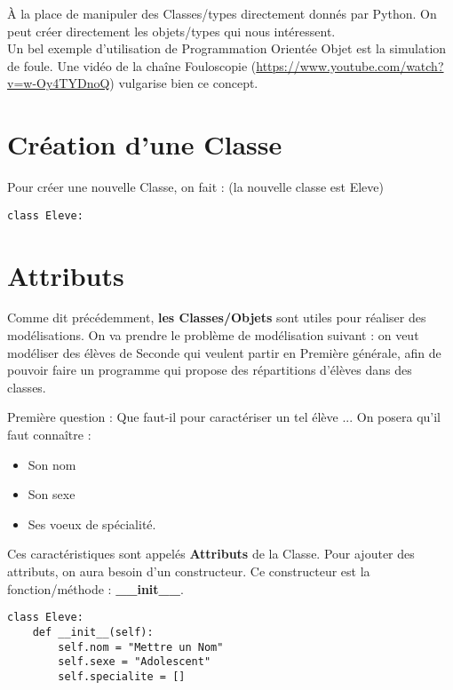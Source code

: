 \documentclass[12pt,fleqn]{report} %
\begin{document}
À la place de manipuler des Classes/types directement donnés par Python. On peut créer directement les objets/types qui nous intéressent. \\

Un bel exemple d'utilisation de Programmation Orientée Objet est la simulation de foule. Une vidéo de la chaîne Fouloscopie (\href{https://www.youtube.com/watch?v=w-Oy4TYDnoQ}{https://www.youtube.com/watch?v=w-Oy4TYDnoQ}) vulgarise bien ce concept. 


\section{Création d'une Classe}


Pour créer une nouvelle Classe, on fait : (la nouvelle classe est Eleve)
\begin{center}
	\begin{varwidth}[t]{.5\textwidth}
		\begin{lstlisting}[language=iPython,linewidth = 4cm]
class Eleve:
\end{lstlisting}
\end{varwidth}\end{center}


\section{Attributs}

Comme dit précédemment, \textbf{les Classes/Objets} sont utiles pour réaliser des modélisations. On va prendre le problème de modélisation suivant : on veut modéliser des élèves de Seconde qui veulent partir en Première générale, afin de pouvoir faire un programme qui propose des répartitions d'élèves dans des classes. 

Première question : Que faut-il pour caractériser un tel élève ... On posera qu'il faut connaître :
\begin{itemize}
	\item Son nom
	\item Son sexe
	\item Ses voeux de spécialité.
\end{itemize} 

Ces caractéristiques sont appelés \textbf{Attributs} de la Classe. Pour ajouter des attributs, on aura besoin d'un constructeur. Ce constructeur est la fonction/méthode : \textbf{\_\_init\_\_}.

\begin{center}
	\begin{varwidth}[t]{.5\textwidth}
		\begin{lstlisting}[language=iPython,linewidth = 12cm]
class Eleve:
	def __init__(self):
		self.nom = "Mettre un Nom"
		self.sexe = "Adolescent"
		self.specialite = []
\end{lstlisting}
\end{varwidth}\end{center}
\end{document}
